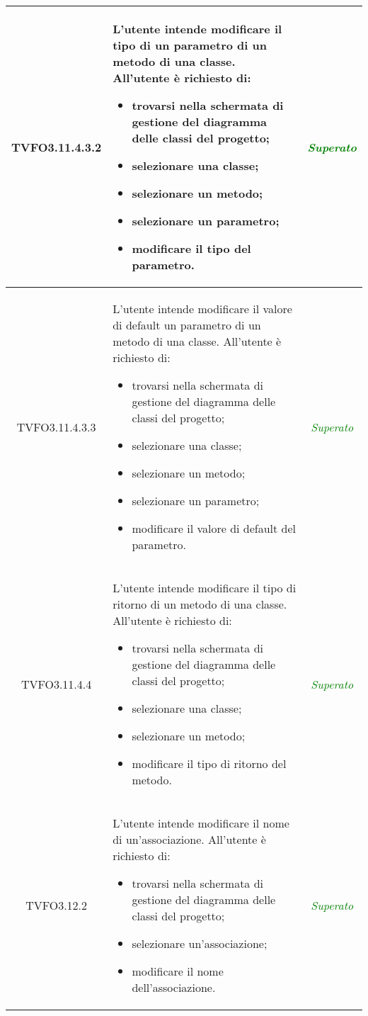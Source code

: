 \begin{longtable}{|c|>{}m{8cm}|c|}
\hypertarget{TVFO3.11.4.3.2}{TVFO3.11.4.3.2} & L'utente intende modificare il tipo di un parametro di un metodo di una classe.
All'utente è richiesto di:
\begin{itemize}
	\item trovarsi nella schermata di gestione del diagramma delle classi del progetto;
	\item selezionare una classe; 
	\item selezionare un metodo;
	\item selezionare un parametro;
	\item modificare il tipo del parametro.
\end{itemize} & \textcolor{Green}{\textit{Superato}}\\ \hline

\hypertarget{TVFO3.11.4.3.3}{TVFO3.11.4.3.3} & L'utente intende modificare il valore di default un parametro di un metodo di una classe.
All'utente è richiesto di:
\begin{itemize}
	\item trovarsi nella schermata di gestione del diagramma delle classi del progetto;
	\item selezionare una classe; 
	\item selezionare un metodo;
	\item selezionare un parametro;
	\item modificare il valore di default del parametro.
\end{itemize} & \textcolor{Green}{\textit{Superato}}\\ \hline

\hypertarget{TVFO3.11.4.4}{TVFO3.11.4.4} & L'utente intende modificare il tipo di ritorno di un metodo di una classe.
All'utente è richiesto di:
\begin{itemize}
	\item trovarsi nella schermata di gestione del diagramma delle classi del progetto;
	\item selezionare una classe;
	\item selezionare un metodo;
	\item modificare il tipo di ritorno del metodo.
\end{itemize} & \textcolor{Green}{\textit{Superato}}\\ \hline

\hypertarget{TVFO3.12.2}{TVFO3.12.2} & L'utente intende modificare il nome di un'associazione.
All'utente è richiesto di:
\begin{itemize}
	\item trovarsi nella schermata di gestione del diagramma delle classi del progetto;
	\item selezionare un'associazione;
	\item modificare il nome dell'associazione.
\end{itemize} & \textcolor{Green}{\textit{Superato}}\\ \hline


\end{longtable}
